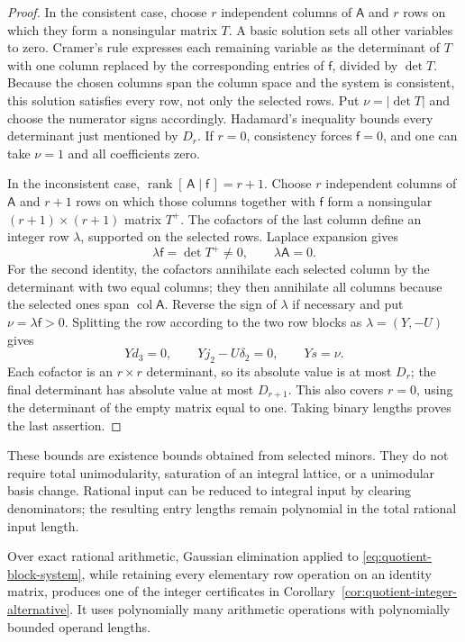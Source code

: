 \begin{proof}
In the consistent case, choose $r$ independent columns of $\mathsf A$
and $r$ rows on which they form a nonsingular matrix $T$. A basic
solution sets all other variables to zero. Cramer's rule expresses
each remaining variable as the determinant of $T$ with one column
replaced by the corresponding entries of $\mathsf f$, divided by
$\det T$. Because the chosen columns span the column space and the
system is consistent, this solution satisfies every row, not only
the selected rows. Put $\nu=|\det T|$ and choose the numerator signs
accordingly. Hadamard's inequality bounds every determinant just
mentioned by $D_r$. If $r=0$, consistency forces $\mathsf f=0$, and
one can take $\nu=1$ and all coefficients zero.

In the inconsistent case,
$\operatorname{rank}[\,\mathsf A\mid\mathsf f\,]=r+1$.
Choose $r$ independent columns of $\mathsf A$ and $r+1$ rows on which
those columns together with $\mathsf f$ form a nonsingular
$(r+1)\times(r+1)$ matrix $T^+$. The cofactors of the last column
define an integer row $\lambda$, supported on the selected rows.
Laplace expansion gives
\[
 \lambda\mathsf f=\det T^+\neq0,
 \qquad \lambda\mathsf A=0.
\]
For the second identity, the cofactors annihilate each selected
column by the determinant with two equal columns; they then
annihilate all columns because the selected ones span
$\operatorname{col}\mathsf A$.
Reverse the sign of $\lambda$ if necessary and put
$\nu=\lambda\mathsf f>0$. Splitting the row according to the two
row blocks as $\lambda=(Y,-U)$ gives
\[
 Yd_3=0,\qquad Yj_2-U\delta_2=0,\qquad Ys=\nu.
\]
Each cofactor is an $r\times r$ determinant, so its absolute value is
at most $D_r$; the final determinant has absolute value at most
$D_{r+1}$. This also covers $r=0$, using the determinant of the empty
matrix equal to one. Taking binary lengths proves the last assertion.
\end{proof}

These bounds are existence bounds obtained from selected minors.
They do not require total unimodularity, saturation of an integral
lattice, or a unimodular basis change. Rational input can be reduced
to integral input by clearing denominators; the resulting entry
lengths remain polynomial in the total rational input length.

\begin{proposition}
\label{prop:quotient-producer}
Over exact rational arithmetic, Gaussian elimination applied to
\eqref{eq:quotient-block-system}, while retaining every elementary row
operation on an identity matrix, produces one of the integer
certificates in Corollary~\ref{cor:quotient-integer-alternative}.
It uses polynomially many arithmetic operations with polynomially
bounded operand lengths.
\end{proposition}


